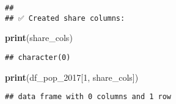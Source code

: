 \documentclass[
]{article}
\newenvironment{Shaded}{\begin{snugshade}}{\end{snugshade}}
\newcommand{\DecValTok}[1]{\textcolor[rgb]{0.00,0.00,0.81}{#1}}
\newcommand{\FunctionTok}[1]{\textcolor[rgb]{0.13,0.29,0.53}{\textbf{#1}}}
\newcommand{\NormalTok}[1]{#1}
\begin{document}
\begin{verbatim}
## 
## ✅ Created share columns:
\end{verbatim}

\begin{Shaded}
\begin{Highlighting}[]
\FunctionTok{print}\NormalTok{(share\_cols)}
\end{Highlighting}
\end{Shaded}

\begin{verbatim}
## character(0)
\end{verbatim}

\begin{Shaded}
\begin{Highlighting}[]
\FunctionTok{print}\NormalTok{(df\_pop\_2017[}\DecValTok{1}\NormalTok{, share\_cols])}
\end{Highlighting}
\end{Shaded}

\begin{verbatim}
## data frame with 0 columns and 1 row
\end{verbatim}
\end{document}
